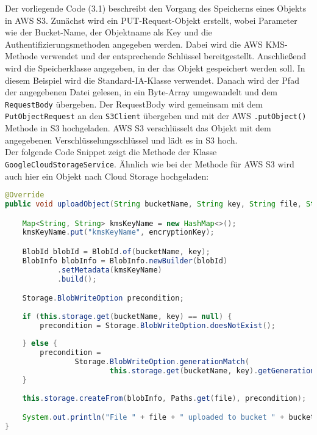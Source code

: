 \newpage

Der vorliegende Code (3.1) beschreibt den Vorgang des Speicherns eines Objekts in AWS S3. Zunächst wird ein PUT-Request-Objekt erstellt, wobei Parameter wie der Bucket-Name, der Objektname als Key und die Authentifizierungsmethoden angegeben werden. Dabei wird die AWS KMS-Methode verwendet und der entsprechende Schlüssel bereitgestellt. Anschließend wird die Speicherklasse angegeben, in der das Objekt gespeichert werden soll. In diesem Beispiel wird die Standard-IA-Klasse verwendet. Danach wird der Pfad der angegebenen Datei gelesen, in ein Byte-Array umgewandelt und dem \verb|RequestBody| übergeben. Der RequestBody wird gemeinsam mit dem \verb|PutObjectRequest| an den \verb|S3Client| übergeben und mit der AWS \verb|.putObject()| Methode in S3 hochgeladen. AWS S3 verschlüsselt das Objekt mit dem angegebenen Verschlüsselungsschlüssel und lädt es in S3 hoch.\\

Der folgende Code Snippet zeigt die Methode der Klasse \verb|GoogleCloudStorageService|. Ähnlich wie bei der Methode für AWS S3 wird auch hier ein Objekt nach Cloud Storage hochgeladen:

\begin{lstlisting}[language=Java, caption=Prototyp Code Snippet - Hochladen eines Objekts nach Cloud Storage]
@Override
public void uploadObject(String bucketName, String key, String file, String encryptionKey, String storageClass) throws IOException {

    Map<String, String> kmsKeyName = new HashMap<>();
    kmsKeyName.put("kmsKeyName", encryptionKey);

    BlobId blobId = BlobId.of(bucketName, key);
    BlobInfo blobInfo = BlobInfo.newBuilder(blobId)
            .setMetadata(kmsKeyName)
            .build();

    Storage.BlobWriteOption precondition;
        
    if (this.storage.get(bucketName, key) == null) {
        precondition = Storage.BlobWriteOption.doesNotExist();
            
    } else {
        precondition =
                Storage.BlobWriteOption.generationMatch(
                        this.storage.get(bucketName, key).getGeneration());
    }
        
    this.storage.createFrom(blobInfo, Paths.get(file), precondition);

    System.out.println("File " + file + " uploaded to bucket " + bucketName + " as " + key);
}
\end{lstlisting}

